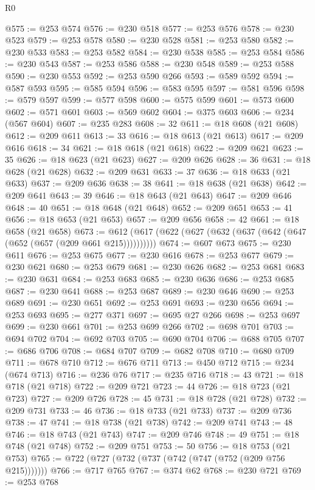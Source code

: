 \begin{lexlean}{R0}
\begin{coremodule}
@575 := @253 @574
@576 := @230 @518
@577 := @253 @576
@578 := @230 @523
@579 := @253 @578
@580 := @230 @528
@581 := @253 @580
@582 := @230 @533
@583 := @253 @582
@584 := @230 @538
@585 := @253 @584
@586 := @230 @543
@587 := @253 @586
@588 := @230 @548
@589 := @253 @588
@590 := @230 @553
@592 := @253 @590 @266
@593 := @589 @592
@594 := @587 @593
@595 := @585 @594
@596 := @583 @595
@597 := @581 @596
@598 := @579 @597
@599 := @577 @598
@600 := @575 @599
@601 := @573 @600
@602 := @571 @601
@603 := @569 @602
@604 := @375 @603
@606 := @234 (@567 @604)
@607 := @235 @283
@608 := 32
@611 := @18 @608 (@21 @608)
@612 := @209 @611
@613 := 33
@616 := @18 @613 (@21 @613)
@617 := @209 @616
@618 := 34
@621 := @18 @618 (@21 @618)
@622 := @209 @621
@623 := 35
@626 := @18 @623 (@21 @623)
@627 := @209 @626
@628 := 36
@631 := @18 @628 (@21 @628)
@632 := @209 @631
@633 := 37
@636 := @18 @633 (@21 @633)
@637 := @209 @636
@638 := 38
@641 := @18 @638 (@21 @638)
@642 := @209 @641
@643 := 39
@646 := @18 @643 (@21 @643)
@647 := @209 @646
@648 := 40
@651 := @18 @648 (@21 @648)
@652 := @209 @651
@653 := 41
@656 := @18 @653 (@21 @653)
@657 := @209 @656
@658 := 42
@661 := @18 @658 (@21 @658)
@673 := @612 (@617 (@622 (@627 (@632 (@637 (@642 (@647 (@652 (@657 (@209 @661 @215))))))))))
@674 := @607 @673
@675 := @230 @611
@676 := @253 @675
@677 := @230 @616
@678 := @253 @677
@679 := @230 @621
@680 := @253 @679
@681 := @230 @626
@682 := @253 @681
@683 := @230 @631
@684 := @253 @683
@685 := @230 @636
@686 := @253 @685
@687 := @230 @641
@688 := @253 @687
@689 := @230 @646
@690 := @253 @689
@691 := @230 @651
@692 := @253 @691
@693 := @230 @656
@694 := @253 @693
@695 := @277 @371
@697 := @695 @27 @266
@698 := @253 @697
@699 := @230 @661
@701 := @253 @699 @266
@702 := @698 @701
@703 := @694 @702
@704 := @692 @703
@705 := @690 @704
@706 := @688 @705
@707 := @686 @706
@708 := @684 @707
@709 := @682 @708
@710 := @680 @709
@711 := @678 @710
@712 := @676 @711
@713 := @450 @712
@715 := @234 (@674 @713)
@716 := @236 @76
@717 := @235 @716
@718 := 43
@721 := @18 @718 (@21 @718)
@722 := @209 @721
@723 := 44
@726 := @18 @723 (@21 @723)
@727 := @209 @726
@728 := 45
@731 := @18 @728 (@21 @728)
@732 := @209 @731
@733 := 46
@736 := @18 @733 (@21 @733)
@737 := @209 @736
@738 := 47
@741 := @18 @738 (@21 @738)
@742 := @209 @741
@743 := 48
@746 := @18 @743 (@21 @743)
@747 := @209 @746
@748 := 49
@751 := @18 @748 (@21 @748)
@752 := @209 @751
@753 := 50
@756 := @18 @753 (@21 @753)
@765 := @722 (@727 (@732 (@737 (@742 (@747 (@752 (@209 @756 @215)))))))
@766 := @717 @765
@767 := @374 @62
@768 := @230 @721
@769 := @253 @768

\end{coremodule}
\end{lexlean}
